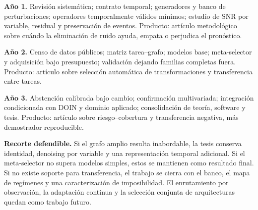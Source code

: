 \documentclass[11pt,letterpaper]{article}
\begin{document}
\textbf{Año 1.}
Revisión sistemática; contrato temporal; generadores y banco de perturbaciones; operadores temporalmente válidos mínimos; estudio de SNR por variable, residual y preservación de eventos.
Producto: artículo metodológico sobre cuándo la eliminación de ruido ayuda, empata o perjudica el pronóstico.

\textbf{Año 2.}
Censo de datos públicos; matriz tarea--grafo; modelos base; meta-selector y adquisición bajo presupuesto; validación dejando familias completas fuera.
Producto: artículo sobre selección automática de transformaciones y transferencia entre tareas.

\textbf{Año 3.}
Abstención calibrada bajo cambio; confirmación multivariada; integración condicionada con DOIN y dominio aplicado; consolidación de teoría, software y tesis.
Producto: artículo sobre riesgo--cobertura y transferencia negativa, más demostrador reproducible.

\textbf{Recorte defendible.}
Si el grafo amplio resulta inabordable, la tesis conserva identidad, denoising por variable y una representación temporal adicional.
Si el meta-selector no supera modelos simples, estos se mantienen como resultado final.
Si no existe soporte para transferencia, el trabajo se cierra con el banco, el mapa de regímenes y una caracterización de imposibilidad.
El enrutamiento por observación, la adaptación continua y la selección conjunta de arquitecturas quedan como trabajo futuro.

\printbibliography[title={Referencias}]
\end{document}
